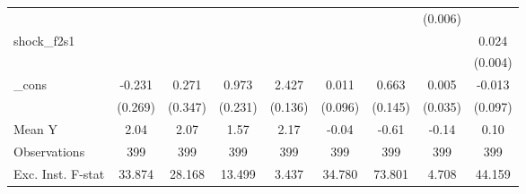 {\begin{tabular}{l*{8}{c}}
            &                     &                     &                     &                     &                     &                     &     (0.006)         &                     \\
\addlinespace
shock\_f2s1  &                     &                     &                     &                     &                     &                     &                     &       0.024\sym{***}\\
            &                     &                     &                     &                     &                     &                     &                     &     (0.004)         \\
\addlinespace
\_cons      &      -0.231         &       0.271         &       0.973\sym{***}&       2.427\sym{***}&       0.011         &       0.663\sym{***}&       0.005         &      -0.013         \\
            &     (0.269)         &     (0.347)         &     (0.231)         &     (0.136)         &     (0.096)         &     (0.145)         &     (0.035)         &     (0.097)         \\
\midrule
Mean Y      &        2.04         &        2.07         &        1.57         &        2.17         &       -0.04         &       -0.61         &       -0.14         &        0.10         \\
Observations&         399         &         399         &         399         &         399         &         399         &         399         &         399         &         399         \\
Exc. Inst. F-stat&      33.874         &      28.168         &      13.499         &       3.437         &      34.780         &      73.801         &       4.708         &      44.159         \\
\bottomrule
\end{tabular}
}
